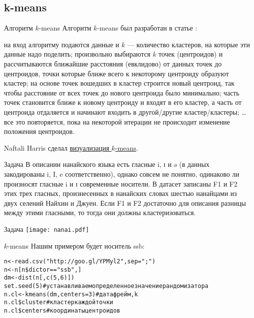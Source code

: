 \subsection{k-means}
\begin{frame}{Алгоритм $k$-means}
\vspace{-2.5mm}
Алгоритм $k$-means был разработан в статье \citep{lloyd82}:
\begin{itemize}
\mytem на вход алгоритму подаются данные и $k$ — количество кластеров, на которые эти данные надо поделить;
\mytem произвольно выбираются $k$ точек (центроидов) и рассчитываются ближайшие расстояния (евклидово) от данных точек до центроидов, точки которые ближе всего к некоторому центроиду образуют кластер;
\mytem на основе точек вошедших в кластер строится новый центроид, так чтобы расстояние от всех точек до нового центроида было минимально;
\mytem часть точек становится ближе к новому центроиду и входят в его кластер, а часть от центроида отдаляется и начинают входить в другой/другие кластер/кластеры;
\mytem … все это повторяется, пока на некоторой итерации не происходит изменение положения центроидов.
\end{itemize}
Naftali Harris сделал \alert{\href{http://www.naftaliharris.com/blog/visualizing-k-means-clustering/}{визуализация $k$-means}}.
\end{frame}
\begin{frame}{Задача}
В описании нанайского языка есть гласные i, ɪ и ə (в данных закодированы i, I, e соответственно), однако совсем не понятно, одинаково ли произносят гласные i и ɪ современные носители. В датасет записаны F1 и F2 этих трех гласных, произнесенных в нанайских словах шестью нанайцами из двух селений Найхин и Джуен. Если F1 и F2 достаточно для описания разницы между этими гласными, то тогда они должны кластеризоваться.
\end{frame}
\begin{frame}{Задача}
\texttt{[image: nanai.pdf]}
\end{frame}
\begin{frame}{$k$-means}
Нашим примером будет носитель ssb:
\scriptsize
\begin{alltt}
n <- read.csv("http://goo.gl/YPMyl2"{}, sep = ";")\\
n <- n[n\$dictor == "ssb"{},]\bigskip\\
dm <- dist(n[, c(5,6)])\\
set.seed(5) \hfill \# устанавливаем определенное значение рандомизатора\\
n.cl <- \alert{kmeans}(dm, \alert{centers = 3}) \hfill \# датафрейм, k\\
n.cl\alert{\$cluster} \hfill \# кластер каждой точки\\
n.cl\alert{\$centers} \hfill \# координаты центроидов\\
\end{alltt}
\end{frame}
